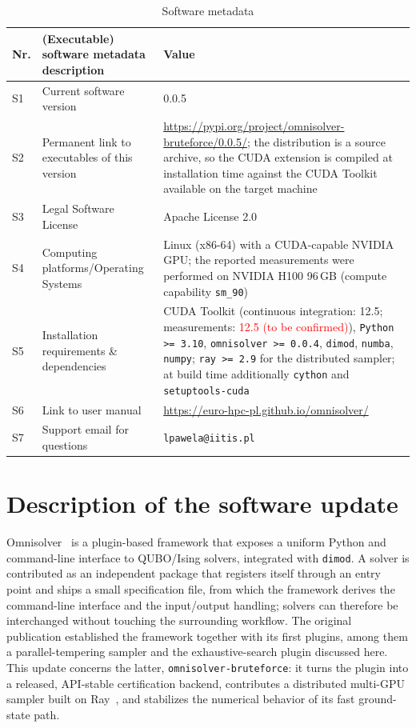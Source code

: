 \documentclass[preprint,12pt,a4paper]{elsarticle}
\newcommand{\cudameas}{\textcolor{red}{12.5 (to be confirmed)}}
\begin{document}
\begin{table}[H]
\setlength{\tabcolsep}{4pt}
\begin{tabular}{|l|p{5.6cm}|p{6.4cm}|}
\hline
\textbf{Nr.} & \textbf{(Executable) software metadata description} &
\textbf{Value} \\
\hline
S1 & Current software version & 0.0.5 \\
\hline
S2 & Permanent link to executables of this version &
\url{https://pypi.org/project/omnisolver-bruteforce/0.0.5/}; the distribution is
a source archive, so the CUDA extension is compiled at installation time against
the CUDA Toolkit available on the target machine \\
\hline
S3 & Legal Software License & Apache License 2.0 \\
\hline
S4 & Computing platforms/Operating Systems & Linux (x86-64) with a CUDA-capable
NVIDIA GPU; the reported measurements were performed on NVIDIA H100 96\,GB
(compute capability \texttt{sm\_90}) \\
\hline
S5 & Installation requirements \& dependencies & CUDA Toolkit (continuous
integration: 12.5; measurements: \cudameas), \texttt{Python >= 3.10},
\texttt{omnisolver >= 0.0.4}, \texttt{dimod}, \texttt{numba}, \texttt{numpy};
\texttt{ray >= 2.9} for the distributed sampler; at build time additionally
\texttt{cython} and \texttt{setuptools-cuda} \\
\hline
S6 & Link to user manual & \url{https://euro-hpc-pl.github.io/omnisolver/} \\
\hline
S7 & Support email for questions & \verb|lpawela@iitis.pl| \\
\hline
\end{tabular}
\caption{Software metadata}
\label{softwareMetadata}
\end{table}

\linenumbers

\section{Description of the software update}
\label{sec:description}

Omnisolver~\cite{jalowiecki2021omnisolver} is a plugin-based framework that
exposes a uniform Python and command-line interface to QUBO/Ising solvers,
integrated with \texttt{dimod}. A solver is contributed as an independent
package that registers itself through an entry point and ships a small
specification file, from which the framework derives the command-line interface
and the input/output handling; solvers can therefore be interchanged without
touching the surrounding workflow. The original publication established the
framework together with its first plugins, among them a parallel-tempering
sampler and the exhaustive-search plugin discussed here. This update concerns
the latter, \texttt{omnisolver-bruteforce}: it turns the plugin into a released,
API-stable certification backend, contributes a distributed multi-GPU sampler
built on Ray~\cite{DBLP:journals/corr/abs-1712-05889}, and stabilizes the
numerical behavior of its fast ground-state path.
\end{document}
